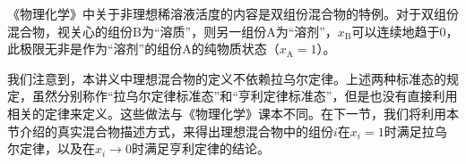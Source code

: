 \documentclass[main.tex]{subfiles}
\begin{document}
《物理化学》中关于非理想稀溶液活度的内容是双组份混合物的特例。对于双组份混合物，视关心的组份B为“溶质”，则另一组份A为“溶剂”，$x_\text{B}$可以连续地趋于0，此极限无非是作为“溶剂”的组份A的纯物质状态（$x_\text{A}=1$）。

我们注意到，本讲义中理想混合物的定义不依赖拉乌尔定律。上述两种标准态的规定，虽然分别称作“拉乌尔定律标准态”和“亨利定律标准态”，但是也没有直接利用相关的定律来定义。这些做法与《物理化学》课本不同。在下一节，我们将利用本节介绍的真实混合物描述方式，来得出理想混合物中的组份$i$在$x_i=1$时满足拉乌尔定律，以及在$x_i\rightarrow 0$时满足亨利定律的结论。
\end{document}
